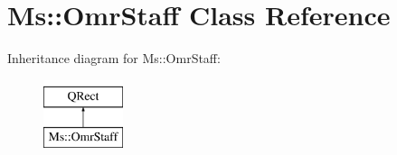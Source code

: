 \hypertarget{class_ms_1_1_omr_staff}{}\section{Ms\+:\+:Omr\+Staff Class Reference}
\label{class_ms_1_1_omr_staff}
Inheritance diagram for Ms\+:\+:Omr\+Staff\+:\begin{figure}[H]
\begin{center}
\leavevmode
\includegraphics[height=2.000000cm]{class_ms_1_1_omr_staff}
\end{center}
\end{figure}
